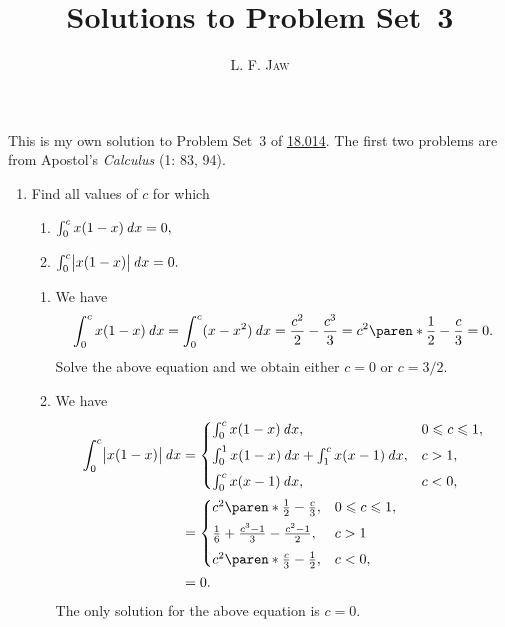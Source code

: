\documentclass[a4paper]{article}
\title{Solutions to Problem Set~3}
\author{L. F. \textsc{Jaw}}
\begin{document}
\maketitle

This is my own solution to Problem Set~3 of
\href{https://ocw.mit.edu/courses/mathematics/18-014-calculus-with-theory-fall-2010/assignments/}{18.014}.
The first two problems are from Apostol's \textit{Calculus} (1: 83, 94).

\begin{enumerate}
\item Find all values of \(c\) for which
  \begin{enumerate}
    \everymath{\displaystyle}
  \item \(\int_0^c x(1-x) \dx = 0,\)
  \item \(\int_0^c \abs[\big]{x(1-x)} \dx = 0.\)
  \end{enumerate}

  \begin{enumerate}
  \item We have
    \begin{displaymath}
      \int_0^c x(1-x) \dx
        = \int_0^c (x - x^2) \dx
        = \frac{c^2}{2} - \frac{c^3}{3}
        = c^2 \paren*{\frac12 - \frac{c}{3}}
        = 0.
    \end{displaymath}
    Solve the above equation and we obtain either \(c = 0\) or \(c = 3/2\).

  \item We have
    \begin{align*}
      \int_0^c \abs[\big]{x(1-x)} \dx
        &= \begin{cases}
          \int_0^c x(1-x) \dx,                       & 0 \le c \le 1, \\[1ex]
          \int_0^1 x(1-x) \dx + \int_1^c x(x-1) \dx, & c > 1,         \\[1ex]
          \int_0^c x(x-1) \dx,                       & c < 0,
        \end{cases} \\
        &= \begin{cases}
          c^2 \paren*{\frac12 - \frac{c}{3}},          & 0 \le c \le 1, \\[1ex]
          \frac16 + \frac{c^3-1}{3} - \frac{c^2-1}{2}, & c > 1          \\[1ex]
          c^2 \paren*{\frac{c}{3} - \frac12},          & c < 0,
        \end{cases} \\
        &= 0.
    \end{align*}
    The only solution for the above equation is \(c = 0\).


\end{enumerate}
\end{enumerate}
\end{document}
